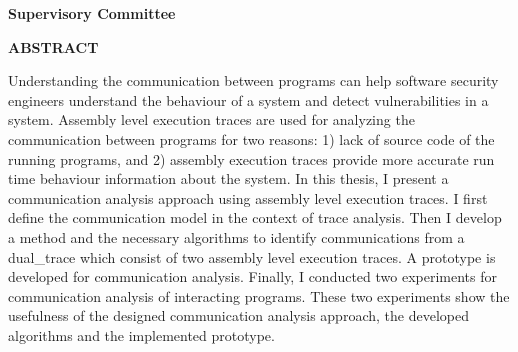 \newpage
{}

\noindent \textbf{Supervisory Committee}
\tpbreak
\panel

\begin{center}
\textbf{ABSTRACT}
\end{center}

Understanding the communication between programs can help software security engineers understand the behaviour of a system and detect vulnerabilities in a system. Assembly level execution traces are used for analyzing the communication between programs for two reasons: 1) lack of source code of the running programs, and 2) assembly execution traces provide more accurate run time behaviour information about the system. In this thesis, I present a communication analysis approach using assembly level execution traces. I first define the communication model in the context of trace analysis. Then I develop a method and the necessary algorithms to identify communications from a dual\_trace which consist of two assembly level execution traces. A prototype is developed for communication analysis. Finally, I conducted two experiments for communication analysis of interacting programs. These two experiments show the usefulness of the designed communication analysis approach, the developed algorithms and the implemented prototype. 

